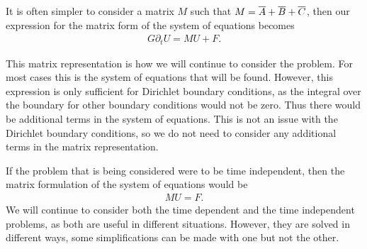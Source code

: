 \documentclass[../fem.tex]{subfile}
\begin{document}
It is often simpler to consider a matrix $M$ such that
$M=\overline{A}+\overline{B}+\overline{C}$, then our expression for the matrix form of the system
of equations becomes
\begin{align}\label{eq:matrix_simp}
   G\partial_tU=MU+F.
\end{align}

This matrix representation is how we will continue to consider the problem. For
most cases this is the system of equations that will be found. However, this
expression is only sufficient for Dirichlet boundary conditions, as the
integral over the boundary for other boundary conditions would not be zero.
Thus there would be additional terms in the system of equations. This is not an
issue with the Dirichlet boundary conditions, so we do not need to consider any
additional terms in the matrix representation.

If the problem that is being considered were to be time independent, then the
matrix formulation of the system of equations would be
\begin{align*}
   MU=F.
\end{align*}
We will continue to consider both the time dependent and the time independent
problems, as both are useful in different situations. However, they are solved
in different ways, some simplifications can be made with one but not the other.
\end{document}

